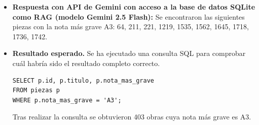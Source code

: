 \begin{itemize}
No encontré más piezas cuya nota más grave sea A3. Si deseas que busque en otras partes del archivo, por favor házmelo saber."
\item \textbf{Respuesta con API de Gemini con acceso a la base de datos SQLite como RAG (modelo Gemini 2.5 Flash):} Se encontraron las siguientes piezas con la nota más grave A3: 64, 211, 221, 1219, 1535, 1562, 1645, 1718, 1736, 1742.  
\item \textbf{Resultado esperado.} Se ha ejecutado una consulta SQL para comprobar cuál habría sido el resultado completo correcto.
    \begin{verbatim}
SELECT p.id, p.titulo, p.nota_mas_grave
FROM piezas p
WHERE p.nota_mas_grave = 'A3';
    \end{verbatim}    
    Tras realizar la consulta se obtuvieron 403 obras cuya nota más grave es A3.
    
\end{itemize}

